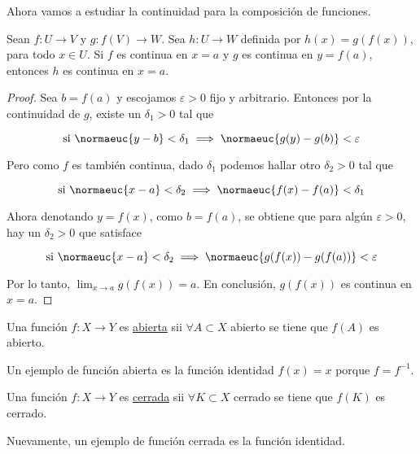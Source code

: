 Ahora vamos a estudiar la continuidad para la composición de funciones.

\begin{teo}
    Sean $f: U \rightarrow V$ y $g: f(V) \rightarrow W$. Sea $h: U \rightarrow W$ definida por $h(x) = g(f(x))$, para todo $x \in U$. Si $f$ es continua en $x = a$ y $g$ es continua en $y = f(a)$, entonces $h$ es continua en $x = a$.
\end{teo}

\begin{proof}
    Sea $b = f(a)$ y escojamos $\varepsilon > 0$ fijo y arbitrario. Entonces por la continuidad de $g$, existe un $\delta_1 > 0$ tal que
    
    \[
    \text{si $\normaeuc{y-b} < \delta_1$} \implies \normaeuc{g(y) - g(b)} < \varepsilon
    \]
    
    Pero como $f$ es también continua, dado $\delta_1$ podemos hallar otro $\delta_2 > 0$ tal que
    
    \[
    \text{si $\normaeuc{x-a} < \delta_2$} \implies \normaeuc{f(x) - f(a)} < \delta_1
    \]
    
    Ahora denotando $y = f(x)$, como $b = f(a)$, se obtiene que para algún $\varepsilon > 0$, hay un $\delta_2 > 0$ que satisface
    
    \[
    \text{si $\normaeuc{x-a} < \delta_2$} \implies \normaeuc{g(f(x)) - g(f(a))} < \varepsilon
    \]
    
    Por lo tanto, $\lim_{x \to a} g(f(x)) = a$. En conclusión, $g(f(x))$ es continua en $x=a$.
\end{proof}

\begin{defn}
    Una función $f: X \rightarrow Y$ es \ul{abierta} sii $\forall A \subset X$ abierto se tiene que $f(A)$ es abierto.
\end{defn}

\begin{ejem}
    Un ejemplo de función abierta es la función identidad $f(x) = x$ porque $f = f^{-1}$.
\end{ejem}

\begin{defn}
    Una función $f: X \rightarrow Y$ es \ul{cerrada} sii $\forall K \subset X$ cerrado se tiene que $f(K)$ es cerrado.
\end{defn}

\begin{ejem}
    Nuevamente, un ejemplo de función cerrada es la función identidad.
\end{ejem}

